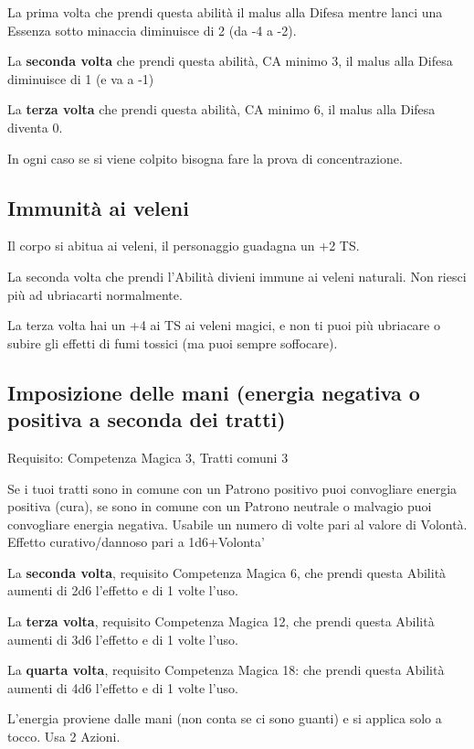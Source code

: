 \documentclass[a4paper,11pt,twoside,openany]{book}
\begin{document}
La prima volta che prendi questa abilità il malus alla Difesa mentre lanci una Essenza sotto minaccia diminuisce di 2 (da -4 a -2).

La \textbf{seconda volta} che prendi questa abilità, CA minimo 3, il malus alla Difesa diminuisce di 1 (e va a -1)

La \textbf{terza volta} che prendi questa abilità, CA minimo 6, il malus alla Difesa diventa 0.

In ogni caso se si viene colpito bisogna fare la prova di concentrazione.

\subsection{Immunità ai veleni}

Il corpo si abitua ai veleni, il personaggio guadagna un +2 TS.

La seconda volta che prendi l'Abilità divieni immune ai veleni naturali.
Non riesci più ad ubriacarti normalmente.

La terza volta hai un +4 ai TS ai veleni magici, e non ti puoi più ubriacare o subire gli effetti di fumi tossici (ma puoi sempre soffocare).

\subsection{Imposizione delle mani (energia negativa o positiva a seconda dei tratti)}

Requisito: Competenza Magica 3, Tratti comuni 3

Se i tuoi tratti sono in comune con un Patrono positivo puoi convogliare energia positiva (cura), se sono in comune con un Patrono neutrale o malvagio puoi convogliare energia negativa. Usabile un numero di volte pari al valore di Volontà. Effetto curativo/dannoso pari a 1d6+Volonta'

La \textbf{seconda volta}, requisito Competenza Magica 6, che prendi questa Abilità aumenti di 2d6 l'effetto e di 1 volte l'uso.

La \textbf{terza volta}, requisito Competenza Magica 12, che prendi questa Abilità aumenti di 3d6 l'effetto e di 1 volte l'uso.

La \textbf{quarta volta}, requisito Competenza Magica 18: che prendi questa Abilità aumenti di 4d6 l'effetto e di 1 volte l'uso.

L'energia proviene dalle mani (non conta se ci sono guanti) e si applica solo a tocco. Usa 2 Azioni.
\end{document}
